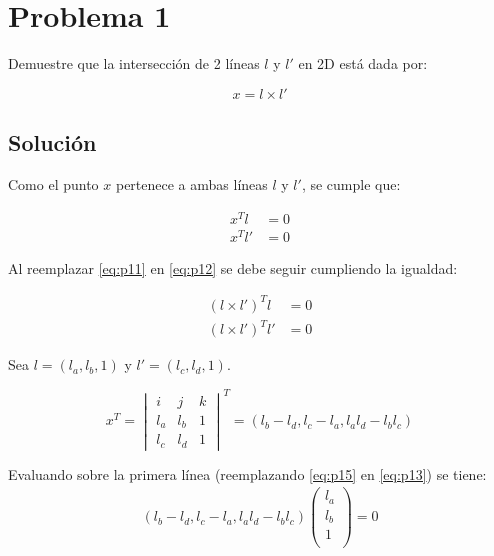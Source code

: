 \section*{Problema 1}
Demuestre que la intersección de 2 líneas $l$ y $l'$ en 2D está dada por:

\begin{equation*}
x=l \times l'
\label{eq:p11}
\end{equation*} 

\subsection*{Solución}

Como el punto $x$ pertenece a ambas líneas $l$ y $l'$, se cumple que:

\begin {equation}
\begin{aligned}
x^{T} l &= 0 \\
x^{T} l' &= 0
\label{eq:p12}
\end{aligned} 
\end {equation}

Al reemplazar \ref{eq:p11} en \ref{eq:p12} se debe seguir cumpliendo la igualdad:

\begin{align}
(l \times l')^{T} l &= 0 \label{eq:p13} \\
(l \times l')^{T} l' &= 0 \label{eq:p14}
\end{align} 

Sea $l=(l_a, l_b, 1)$ y $l'=(l_c, l_d,1)$.

\begin{equation}
x^T = 
\begin{vmatrix}
    i & j & k \\
    l_a & l_b & 1 \\
    l_c & l_d & 1
\end{vmatrix}^T
=
(l_b -l_d,    l_c -l_a ,    l_a l_d - l_b l_c )
\label{eq:p15}
\end{equation} 

Evaluando sobre la primera línea (reemplazando \ref{eq:p15} en \ref{eq:p13}) se tiene:
\begin{align*}
(l_b -l_d,    l_c -l_a ,    l_a l_d - l_b l_c )
\begin{pmatrix}
    l_a \\
    l_b \\
    1 \\
\end{pmatrix}
= 0
\end{align*} 

